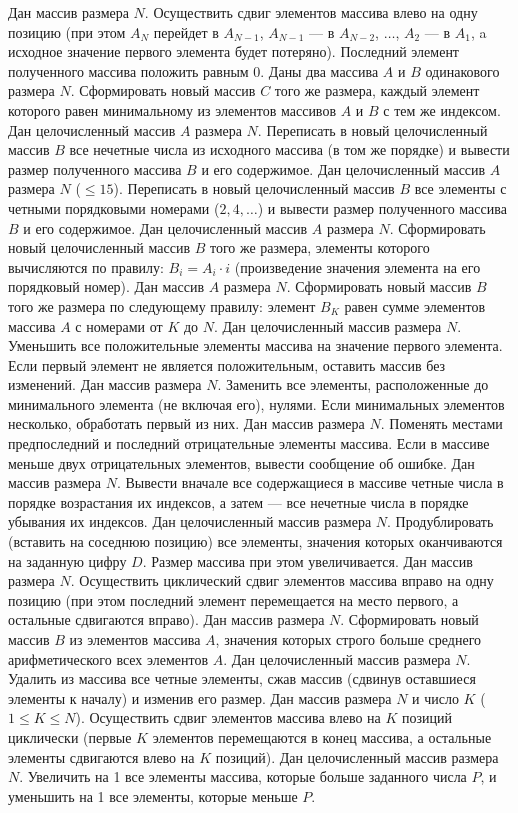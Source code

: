 Дан массив размера $N$. Осуществить сдвиг элементов массива влево на одну позицию (при этом $A_N$ перейдет в $A_{N - 1}$, $A_{N - 1}$ --- в $A_{N - 2}$, $\dots$, $A_2$ --- в $A_1$, a исходное значение первого элемента будет потеряно). Последний элемент полученного массива положить равным $0$.
Даны два массива $A$ и $B$ одинакового размера $N$. Сформировать новый массив $C$ того же размера, каждый элемент которого равен минимальному из элементов массивов $A$ и $B$ с тем же индексом.
Дан целочисленный массив $A$ размера $N$. Переписать в новый целочисленный массив $B$ все нечетные числа из исходного массива (в том же порядке) и вывести размер полученного массива $B$ и его содержимое.
Дан целочисленный массив $A$ размера $N$ ($\leq 15$). Переписать в новый целочисленный массив $B$ все элементы с четными порядковыми номерами ($2, 4, \dots$) и вывести размер полученного массива $B$ и его содержимое.
Дан целочисленный массив $A$ размера $N$. Сформировать новый целочисленный массив $B$ того же размера, элементы которого вычисляются по правилу: $B_i = A_i \cdot i$ (произведение значения элемента на его порядковый номер).
Дан массив $A$ размера $N$. Сформировать новый массив $B$ того же размера по следующему правилу: элемент $B_K$ равен сумме элементов массива $A$ с номерами от $K$ до $N$.
Дан целочисленный массив размера $N$. Уменьшить все положительные элементы массива на значение первого элемента. Если первый элемент не является положительным, оставить массив без изменений.
Дан массив размера $N$. Заменить все элементы, расположенные до минимального элемента (не включая его), нулями. Если минимальных элементов несколько, обработать первый из них.
Дан массив размера $N$. Поменять местами предпоследний и последний отрицательные элементы массива. Если в массиве меньше двух отрицательных элементов, вывести сообщение об ошибке.
Дан массив размера $N$. Вывести вначале все содержащиеся в массиве четные числа в порядке возрастания их индексов, а затем --- все нечетные числа в порядке убывания их индексов.
Дан целочисленный массив размера $N$. Продублировать (вставить на соседнюю позицию) все элементы, значения которых оканчиваются на заданную цифру $D$. Размер массива при этом увеличивается.
Дан массив размера $N$. Осуществить циклический сдвиг элементов массива вправо на одну позицию (при этом последний элемент перемещается на место первого, а остальные сдвигаются вправо).
Дан массив размера $N$. Сформировать новый массив $B$ из элементов массива $A$, значения которых строго больше среднего арифметического всех элементов $A$.
Дан целочисленный массив размера $N$. Удалить из массива все четные элементы, сжав массив (сдвинув оставшиеся элементы к началу) и изменив его размер.
Дан массив размера $N$ и число $K$ ($1 \leq K \leq N$). Осуществить сдвиг элементов массива влево на $K$ позиций циклически (первые $K$ элементов перемещаются в конец массива, а остальные элементы сдвигаются влево на $K$ позиций).
Дан целочисленный массив размера $N$. Увеличить на 1 все элементы массива, которые больше заданного числа $P$, и уменьшить на 1 все элементы, которые меньше $P$.
